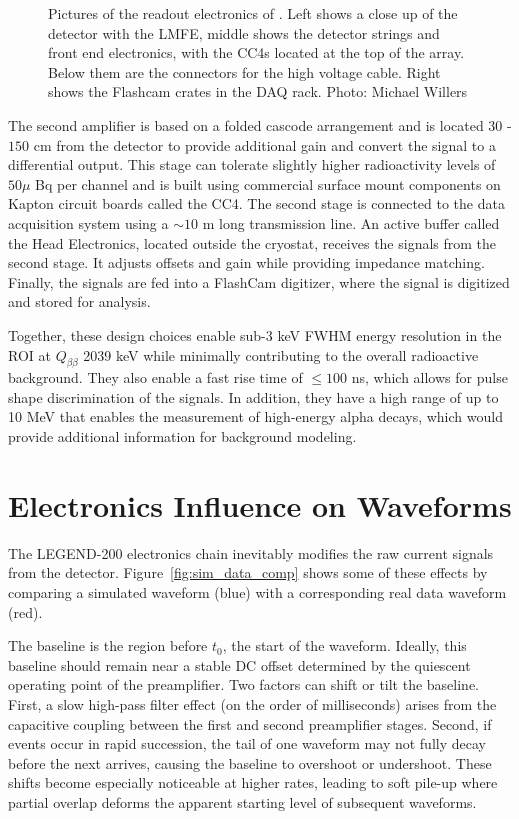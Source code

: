 \begin{figure}[!htb]
    \caption{Pictures of the readout electronics of {\Ltwo}. Left shows a close up of the detector with the LMFE, middle shows the detector strings and front end electronics, with the CC4s located at the top of the array. Below them are the connectors for the high voltage cable. Right shows the Flashcam crates in the DAQ rack. Photo: Michael Willers}
   \label{ch6_fig_l200_elec_model_real}
\end{figure}


The second amplifier is based on a folded cascode arrangement and is located $30$ -$150$ cm from the detector to provide additional gain and convert the signal to a differential output. This stage can tolerate slightly higher radioactivity levels of $50\mu$ Bq per channel and is built using commercial surface mount components on Kapton circuit boards called the CC4. The second stage is connected to the data acquisition system using a $\sim 10$ m long transmission line. An active buffer called the Head Electronics, located outside the cryostat, receives the signals from the second stage. It adjusts offsets and gain while providing impedance matching. Finally, the signals are fed into a FlashCam digitizer, where the signal is digitized and stored for analysis.

Together, these design choices enable sub-3 keV FWHM energy resolution in the ROI at $Q_{\beta\beta}$ 2039 keV while minimally contributing to the overall radioactive background. They also enable a fast rise time of $\leq 100$ ns, which allows for pulse shape discrimination of the signals. In addition, they have a high range of up to 10 MeV that enables the measurement of high-energy alpha decays, which would provide additional information for background modeling.

\section{Electronics Influence on Waveforms}
The LEGEND-200 electronics chain inevitably modifies the raw current signals from the detector. Figure~\ref{fig:sim_data_comp} shows some of these effects by comparing a simulated waveform (blue) with a corresponding real data waveform (red).

The baseline is the region before $t_0$, the start of the waveform. Ideally, this baseline should remain near a stable DC offset determined by the quiescent operating point of the preamplifier. Two factors can shift or tilt the baseline. First, a slow high-pass filter effect (on the order of milliseconds) arises from the capacitive coupling between the first and second preamplifier stages. Second, if events occur in rapid succession, the tail of one waveform may not fully decay before the next arrives, causing the baseline to overshoot or undershoot. These shifts become especially noticeable at higher rates, leading to soft pile-up where partial overlap deforms the apparent starting level of subsequent waveforms. 

